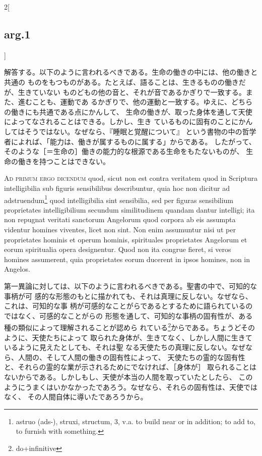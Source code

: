 \documentclass[paper=a4paper,fontsize=10pt,jafontsize=9pt,titlepage]{jlreq}
\begin{document}
\begin{paracol}{2}[\subsection{arg.1}]
\switchcolumn

解答する。以下のように言われるべきである。生命の働きの中には、他の働きと共通の
 ものをもつものがある。たとえば、語ることは、生きるものの働きだが、生きていない
 ものどもの他の音と、それが音であるかぎりで一致する。また、進むことも、運動であ
 るかぎりで、他の運動と一致する。ゆえに、どちらの働きにも共通である点にかんして、
 生命の働きが、取った身体を通して天使によってなされることはできる。しかし、生き
 ているものに固有のことにかんしてはそうではない。なぜなら、『睡眠と覚醒について』
 という書物の中の哲学者によれば、「能力は、働きが属するものに属する」からである。
 したがって、そのような［＝生命の］働きの能力的な根源である生命をもたないものが、
 生命の働きを持つことはできない。

\switchcolumn*[\subsection{ad.1}]

{\scshape Ad primum ergo dicendum} quod, sicut non est contra veritatem quod in
Scriptura intelligibilia sub figuris sensibilibus describuntur, quia hoc non
dicitur ad adstruendum\footnote{astruo (ads-), struxi, structum, 3, v.a. to
build near or in addition; to add to, to furnish with something.} quod
intelligibilia sint sensibilia, sed per figuras sensibilium proprietates
intelligibilium secundum similitudinem quandam dantur intelligi; ita non
repugnat veritati sanctorum Angelorum quod corpora ab eis assumpta videntur
homines viventes, licet non sint. Non enim assumuntur nisi ut per proprietates
hominis et operum hominis, spirituales proprietates Angelorum et eorum
spiritualia opera designentur. Quod non ita congrue fieret, si veros homines
assumerent, quia proprietates eorum ducerent in ipsos homines, non in Angelos.

\switchcolumn

第一異論に対しては、以下のように言われるべきである。聖書の中で、可知的な事柄が可
感的な形態のもとに描かれても、それは真理に反しない。なぜなら、これは、可知的な事
柄が可感的なことがらであるとするために語られているのではなく、可感的なことがらの
形態を通して、可知的な事柄の固有性が、ある種の類似によって理解されることが認めら
れている\footnote{do+infinitive}からである。ちょうどそのように、天使たちによって
取られた身体が、生きてなく、しかし人間に生きているように見えたとしても、それは聖
なる天使たちの真理に反しない。なぜなら、人間の、そして人間の働きの固有性によって、
天使たちの霊的な固有性と、それらの霊的な業が示されるためにでなければ、［身体が］
取られることはないからである。しかしもし、天使が本当の人間を取っていたとしたら、
このようにうまくはいかなかったであろう。なぜなら、それらの固有性は、天使ではなく、
その人間自体に導いたであろうから。


\end{paracol}
\end{document}
